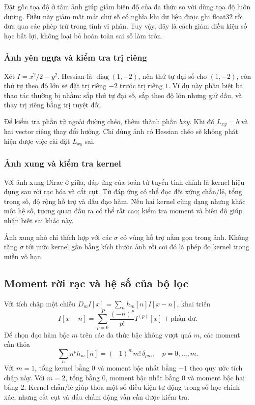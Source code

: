 Đặt gốc tọa độ ở tâm ảnh giúp giảm biên độ của đa thức so với dùng tọa độ luôn dương. Điều này giảm mất mát chữ số có nghĩa khi dữ liệu được ghi float32 rồi đưa qua các phép trừ trong tính vi phân. Tuy vậy, đây là cách giảm điều kiện số học bất lợi, không loại bỏ hoàn toàn sai số làm tròn.

\subsubsection{Ảnh yên ngựa và kiểm tra trị riêng}
Xét $I=x^2/2-y^2$. Hessian là $\operatorname{diag}(1,-2)$, nên thứ tự đại số cho $(1,-2)$, còn thứ tự theo độ lớn sẽ đặt trị riêng $-2$ trước trị riêng $1$. Ví dụ này phân biệt ba thao tác thường bị nhầm: sắp thứ tự đại số, sắp theo độ lớn nhưng giữ dấu, và thay trị riêng bằng trị tuyệt đối.

Để kiểm tra phần tử ngoài đường chéo, thêm thành phần $bxy$. Khi đó $L_{xy}=b$ và hai vector riêng thay đổi hướng. Chỉ dùng ảnh có Hessian chéo sẽ không phát hiện được việc cài đặt $L_{xy}$ sai.

\subsubsection{Ảnh xung và kiểm tra kernel}
Với ảnh xung Dirac ở giữa, đáp ứng của toán tử tuyến tính chính là kernel hiệu dụng sau rời rạc hóa và cắt cụt. Từ đáp ứng có thể đọc đối xứng chẵn/lẻ, tổng trọng số, độ rộng hỗ trợ và dấu đạo hàm. Nếu hai kernel cùng dạng nhưng khác một hệ số, tương quan đầu ra có thể rất cao; kiểm tra moment và biên độ giúp nhận biết sai khác này.

Ảnh xung nhỏ chỉ thích hợp với các $\sigma$ có vùng hỗ trợ nằm gọn trong ảnh. Không tăng $\sigma$ tới mức kernel gần bằng kích thước ảnh rồi coi đó là phép đo kernel trong miền vô hạn.

\subsection{Moment rời rạc và hệ số của bộ lọc}
Với tích chập một chiều $D_mI[x]=\sum_n h_m[n]I[x-n]$, khai triển
\begin{equation}
I[x-n]=\sum_{p=0}^{P}\frac{(-n)^p}{p!}I^{(p)}[x]+\text{phần dư}.
\end{equation}
Để chọn đạo hàm bậc $m$ trên các đa thức bậc không vượt quá $m$, các moment cần thỏa
\begin{equation}
\sum_n n^p h_m[n]=(-1)^m m!\,\delta_{pm},
\quad p=0,\ldots,m.
\label{eq:discrete_moments_detail}
\end{equation}
Với $m=1$, tổng kernel bằng 0 và moment bậc nhất bằng $-1$ theo quy ước tích chập này. Với $m=2$, tổng bằng 0, moment bậc nhất bằng 0 và moment bậc hai bằng 2. Kernel chẵn/lẻ giúp thỏa một số điều kiện tự động trong số học chính xác, nhưng cắt cụt và dấu chấm động vẫn cần được kiểm tra.

